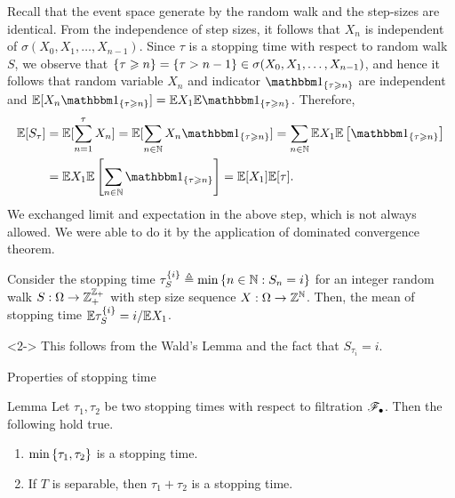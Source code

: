 \documentclass[12pt,aspectratio=169]{beamer}
\begin{document}
\begin{frame}
\begin{Proof} 
Recall that the event space generate by the random walk and the step-sizes are identical. 
From the independence of step sizes, it follows that $X_n$ is independent of $\sigma(X_0, X_1, \dots, X_{n-1})$. 
Since $\tau$ is a stopping time with respect to random walk $S$, 
we observe that $\left\{\tau \geqslant n\right\} = \left\{\tau > n-1\right\} \in \sigma(X_0, X_1, \dots, X_{n-1})$,  
and hence it follows that random variable $X_n$ and indicator $\SetIn{\tau \ge n}$ are independent and $\E[X_n\SetIn{\tau \ge n}] = \E X_1 \E\SetIn{\tau \ge n}$. 
Therefore,
\begin{align*}
\E[S_\tau]
&= \E[\sum_{n=1}^\tau X_n]
= \E[\sum_{n \in \N} X_n\SetIn{\tau \ge n}]
= \sum_{n \in \N} \E X_1 \E\left[\SetIn{\tau \ge n}\right] \\
&= \E X_1\E\left[ \sum_{n \in \N}\SetIn{\tau \ge n}\right] 
= \E[X_1]\E[\tau].
\end{align*}
We exchanged limit and expectation in the above step, which is not always allowed. 
We were able to do it %
by the application of dominated convergence theorem. 
\end{Proof}
\end{frame}


\begin{frame}
\begin{cor} 
Consider the stopping time $\tau_S^{\left\{i\right\}} \triangleq \min\left\{n \in \mathbb{N}: S_n = i\right\}$ for an integer random walk $S: \Omega \to \mathbb{Z}_+^{\mathbb{Z}_+}$ with \iid step size sequence $X: \Omega \to \mathbb{Z}^{\mathbb{N}}$.  
Then, the mean of stopping time $\mathbb{E} \tau_S^{\left\{i\right\}} = {i}/{\mathbb{E} X_1}$. 
\end{cor}
\begin{Proof}<2->
This follows from the Wald's Lemma and the fact that $S_{\tau_i} = i$. 
\end{Proof}
\end{frame}


\begin{frame}{Properties of stopping time} 
\begin{block}{Lemma}
Let $\tau_1,\tau_2$ be two stopping times with respect to filtration $\mathscr{F}_\bullet$.  
Then the following hold true. 
\begin{enumerate}[i\_]
\item $\min \left\{\tau_1,\tau_2\right\} $ is a stopping time. 
\item If $T$ is separable, then $\tau_1+\tau_2$ is a stopping time.
\end{enumerate}
\end{block}
\end{frame}
\end{document}

